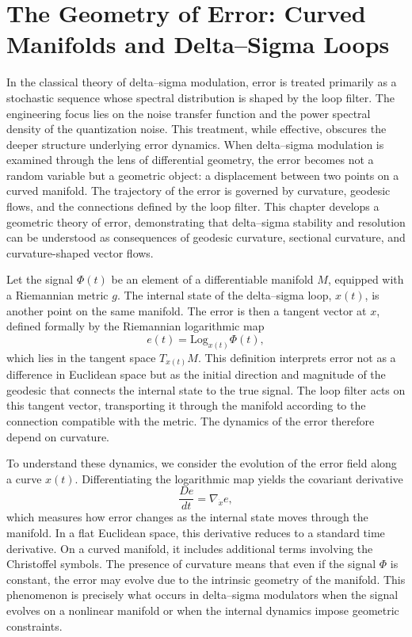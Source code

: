 
\chapter{The Geometry of Error: Curved Manifolds and Delta–Sigma Loops}

In the classical theory of delta–sigma modulation, error is treated primarily as a stochastic sequence whose spectral distribution is shaped by the loop filter. The engineering focus lies on the noise transfer function and the power spectral density of the quantization noise. This treatment, while effective, obscures the deeper structure underlying error dynamics. When delta–sigma modulation is examined through the lens of differential geometry, the error becomes not a random variable but a geometric object: a displacement between two points on a curved manifold. The trajectory of the error is governed by curvature, geodesic flows, and the connections defined by the loop filter. This chapter develops a geometric theory of error, demonstrating that delta–sigma stability and resolution can be understood as consequences of geodesic curvature, sectional curvature, and curvature-shaped vector flows.

Let the signal \( \Phi(t) \) be an element of a differentiable manifold \(M\), equipped with a Riemannian metric \(g\). The internal state of the delta–sigma loop, \( x(t) \), is another point on the same manifold. The error is then a tangent vector at \(x\), defined formally by the Riemannian logarithmic map
\[
e(t) = \mathrm{Log}_{x(t)} \Phi(t),
\]
which lies in the tangent space \(T_{x(t)}M\). This definition interprets error not as a difference in Euclidean space but as the initial direction and magnitude of the geodesic that connects the internal state to the true signal. The loop filter acts on this tangent vector, transporting it through the manifold according to the connection compatible with the metric. The dynamics of the error therefore depend on curvature.

To understand these dynamics, we consider the evolution of the error field along a curve \(x(t)\). Differentiating the logarithmic map yields the covariant derivative
\[
\frac{D e}{d t} = \nabla_{\dot{x}} e,
\]
which measures how error changes as the internal state moves through the manifold. In a flat Euclidean space, this derivative reduces to a standard time derivative. On a curved manifold, it includes additional terms involving the Christoffel symbols. The presence of curvature means that even if the signal \(\Phi\) is constant, the error may evolve due to the intrinsic geometry of the manifold. This phenomenon is precisely what occurs in delta–sigma modulators when the signal evolves on a nonlinear manifold or when the internal dynamics impose geometric constraints.

